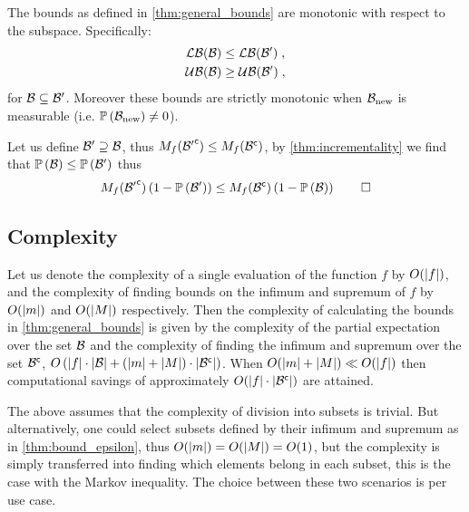 \begin{corollaryE}
	\label{thm:monotonicity}
	The bounds as defined in \cref{thm:general_bounds} are monotonic with respect to the subspace. Specifically:
	\begin{subequations}
		\begin{align}
			\operatorname*{\mathcal{LB}}(\mathcal B) & \leq\operatorname*{\mathcal{LB}}(\mathcal B^\prime)\;, \\
			\operatorname*{\mathcal{UB}}(\mathcal B) & \geq\operatorname*{\mathcal{UB}}(\mathcal B^\prime)\;,
		\end{align}
	\end{subequations}
	for $\mathcal B\subseteq\mathcal B^\prime$. Moreover these bounds are strictly monotonic when $\mathcal B_{\textrm{\textup{new}}}$ is measurable (i.e. $\mathbb{P}\left({\mathcal B_{\textrm{\textup{new}}}}\right)\neq0$).
\end{corollaryE}
\begin{proofE}
	Let us define $\mathcal B^\prime\supseteq\mathcal B$, thus $M_f({\mathcal B^\prime}^{\mathsf{c}})\leq M_f({\mathcal B}^{\mathsf{c}})$, by \cref{thm:incrementality} we find that $\mathbb{P}\left({\mathcal B}\right)\leq\mathbb{P}\left({\mathcal B^\prime}\right)$ thus
	\begin{equation*}
		M_f({\mathcal B^\prime}^{\mathsf{c}})\left(1-\mathbb{P}\left({\mathcal B^\prime}\right)\right) \leq M_f({\mathcal B}^{\mathsf{c}})\left(1-\mathbb{P}\left({\mathcal B}\right)\right)\qed
	\end{equation*}
\end{proofE}

\subsection{Complexity}\label{sec:complexity}
Let us denote the complexity of a single evaluation of the function $f$ by $O(\lvert f\rvert)$, and the complexity of finding bounds on the infimum and supremum of $f$ by $O(\lvert m\rvert)$ and $O(\lvert M\rvert)$ respectively. Then the complexity of calculating the bounds in \cref{thm:general_bounds} is given by the complexity of the partial expectation over the set $\mathcal B$ and the complexity of finding the infimum and supremum over the set ${\mathcal B}^{\mathsf{c}}$, $O\left(\lvert f\rvert\cdot\lvert\mathcal B\rvert+\left(\lvert m\rvert+\lvert M\rvert\right)\cdot\lvert{\ensuremath{\mathcal B}}^{\mathsf{c}}\rvert\right)$. When $O(\lvert m\rvert+\lvert M\rvert)\ll O(\lvert f\rvert)$ then computational savings of approximately $O(\lvert f\rvert\cdot\lvert{\ensuremath{\mathcal B}}^{\mathsf{c}}\rvert)$ are attained.

The above assumes that the complexity of division into subsets is trivial. But alternatively, one could select subsets defined by their infimum and supremum as in \cref{thm:bound_epsilon}, thus $O(\lvert m\rvert)=O(\lvert M\rvert)=O(1)$, but the complexity is simply transferred into finding which elements belong in each subset, this is the case with the Markov inequality. The choice between these two scenarios is per use case.

